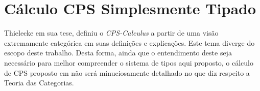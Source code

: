 \section{Cálculo CPS Simplesmente Tipado}\label{sec:cps-calculus-thielecke}
Thielecke em sua tese, definiu o \textit{CPS-Calculus} a partir de uma visão extremamente categórica em suas definições e explicações.
Este tema diverge do escopo deste trabalho.
Desta forma, ainda que o entendimento deste seja necessário para melhor compreender o sistema de tipos aqui proposto, o cálculo de CPS proposto em  não será minuciosamente detalhado no que diz respeito a Teoria das Categorias.

